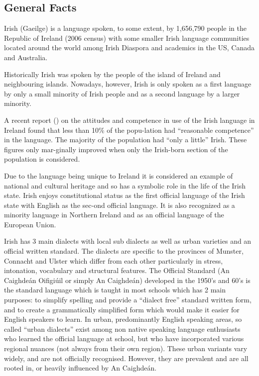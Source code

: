 \documentclass[]{../../metanetpaper}
\begin{document}
\clearpage


\begin{multicols}{2}

\subsection{General Facts}

Irish (Gaeilge) is a language spoken, to some extent, by 1,656,790 people in the Republic of Ireland (2006 census) with some smaller Irish language communities located around the world among Irish Diaspora and academics in the US, Canada and Australia.

Historically Irish was spoken by the people of the island of Ireland and neighbouring islands. Nowadays, however, Irish is only spoken as a first language by only a small minority of Irish people and as a second language by a larger minority.

A recent report (\cite{pobail1})  on the attitudes and competence in use of the Irish language in Ireland found that less than 10\% of the popu-lation had ``reasonable competence'' in the language. The majority of the population had ``only a little'' Irish. These figures only mar-ginally improved when only the Irish-born section of the population is considered.



Due to the language being unique to Ireland it is considered an example of national and cultural heritage and so has a symbolic role in the life of the Irish state. Irish enjoys constitutional status as the first official language of the Irish state with English as the sec-ond official language. It is also recognized as a minority language in Northern Ireland and as an official language of the European Union.

Irish has 3 main dialects with local sub dialects as well as urban varieties and an official written standard. The dialects are specific to the provinces of Munster, Connacht and Ulster which differ from each other particularly in stress, intonation, vocabulary and structural features. The Official Standard (An Caighdeán Oifigiúil or simply An Caighdeán) developed in the 1950’s and 60’s is the standard language which is taught in most schools which has 2 main purposes: to simplify spelling and provide a ``dialect free'' standard written form, and to create a grammatically simplified form which would make it easier for English speakers to learn. In urban, predominantly English speaking areas, so called ``urban dialects'' exist among non native speaking language enthusiasts who learned the official language at school, but who have incorporated various regional nuances (not always from their own region). These urban variants vary widely, and are not officially recognised. However, they are prevalent and are all rooted in, or heavily influenced by An Caighdeán.



\end{multicols}
\end{document}
